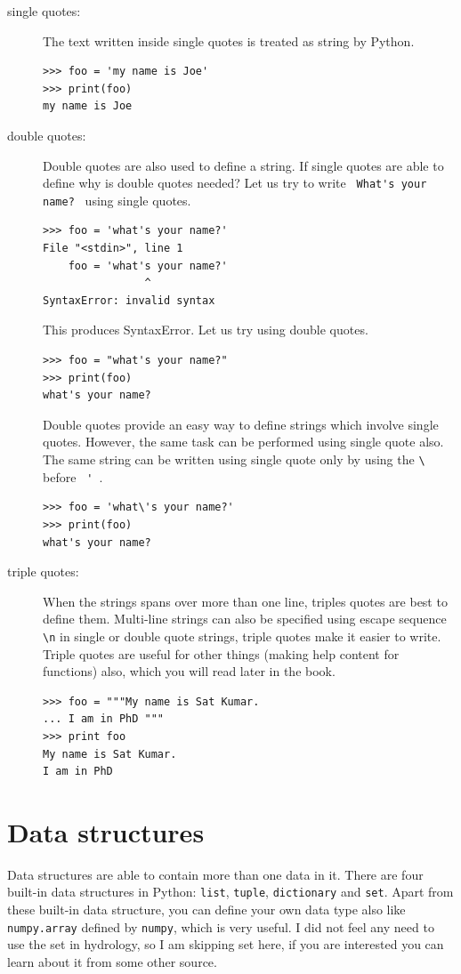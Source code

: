 \documentclass[10pt]{book}
\begin{document}
{\begin{description}
\item[single quotes:] The text written inside single quotes is treated as string by Python. 
\beforeverb
\begin{verbatim}
>>> foo = 'my name is Joe'
>>> print(foo)
my name is Joe
\end{verbatim}
\afterverb

\item[double quotes:] Double quotes are also used to define a string. If single quotes are able to define why is double quotes needed? Let us try to write \verb" What's your name? " using single quotes.
\beforeverb
\begin{verbatim}
>>> foo = 'what's your name?'
File "<stdin>", line 1
    foo = 'what's your name?'
                ^
SyntaxError: invalid syntax
\end{verbatim}
\afterverb
This produces SyntaxError. Let us try using double quotes.

\beforeverb
\begin{verbatim}
>>> foo = "what's your name?"
>>> print(foo)
what's your name?
\end{verbatim}
\afterverb
Double quotes provide an easy way to define strings which involve single quotes. However, the same task can be performed using single quote also. The same string can be written using single quote only by using the \verb"\" before \verb" ' ". 
\beforeverb \begin{verbatim}
>>> foo = 'what\'s your name?'
>>> print(foo)
what's your name?
\end{verbatim} \afterverb

\item[triple quotes:]  When the strings spans over more than one line, triples quotes are best to define them. Multi-line strings can also be specified using escape sequence \verb"\n" in single or double quote strings, triple quotes make it easier to write. Triple quotes are useful for other things (making help content for functions) also, which you will read later in the book.
\beforeverb
\begin{verbatim}
>>> foo = """My name is Sat Kumar.
... I am in PhD """
>>> print foo
My name is Sat Kumar.
I am in PhD 
\end{verbatim}
\afterverb

\end{description}

\section{Data structures}
Data structures are able to contain more than one data in it. There are four built-in data structures in Python: {\tt list}, {\tt tuple}, {\tt dictionary} and {\tt set}. Apart from these built-in data structure, you can define your own data type also like {\tt numpy.array} defined by {\tt numpy}, which is very useful. I did not feel any need to use the set in hydrology, so I am skipping set here, if you are interested you can learn about it from some other source. 
}
\end{document}
